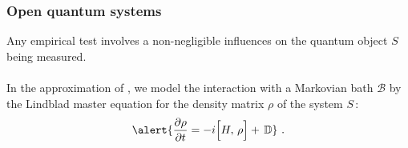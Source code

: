 \begin{frame}
    \frametitle{Open quantum systems}
    \begin{figure}[!t]
    \centering
    \end{figure}
    \small
    Any empirical test involves a non-negligible influences on the quantum object $ S $ being measured.\\
    $ $\\
    In the approximation of , we model the interaction with a Markovian bath $\mathscr{B}$ by the \alert{Lindblad master equation} for the density matrix $\rho$ of the system $S\,$:
    \begin{equation}
    \alert{
    \frac{\partial \rho}{\partial t} = -i \Bigr[ H,\,\rho \Bigr] + \,\D 
    }\,\,.
    \end{equation}
    \end{frame}
    
    
